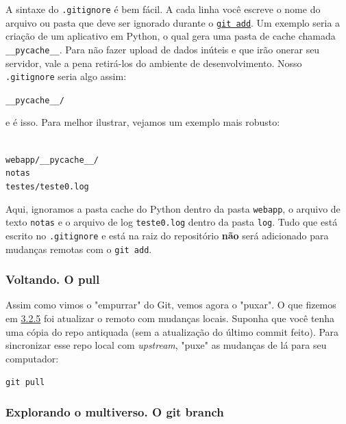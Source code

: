 \documentclass{article}
\begin{document}
  A sintaxe do \texttt{.gitignore} é bem fácil. A cada linha você escreve o nome do arquivo ou pasta que deve 
  ser ignorado durante o \href{sec:add}{\texttt{git add}}. Um exemplo seria a criação de um aplicativo em 
  Python, o qual gera uma pasta de cache chamada \texttt{\_\_pycache\_\_}. Para não fazer upload de dados inúteis e que 
  irão onerar seu servidor, vale a pena retirá-los do ambiente de desenvolvimento. Nosso \texttt{.gitignore} seria algo assim: 

  \vspace{1ex}
  \texttt{\_\_pycache\_\_/}
  \vspace{1ex}

  e é isso. Para melhor ilustrar, vejamos um exemplo mais robusto: 
  
  \vspace{1ex}
  \texttt{\\ 
  \noindent webapp/\_\_pycache\_\_/  \\ 
  \noindent notas \\ 
  \noindent testes/teste0.log}
  \vspace{1ex}

  Aqui, ignoramos a pasta cache do Python dentro da pasta \texttt{webapp}, o arquivo de texto \texttt{notas} e o arquivo 
  de log \texttt{teste0.log} dentro da pasta \texttt{log}. Tudo que está escrito no \texttt{.gitignore} e está na raiz 
  do repositório \textbf{não} será adicionado para mudanças remotas com o \texttt{git add}.
  
  
  \subsubsection{Voltando. O pull}

  Assim como vimos o "empurrar" do Git, vemos agora o "puxar". O que fizemos em \href{sec:push}{3.2.5} foi atualizar o remoto com 
  mudanças locais. Suponha que você tenha uma cópia do repo antiquada (sem a atualização do último commit feito). Para sincronizar 
  esse repo local com \textit{upstream}, "puxe" as mudanças de lá para seu computador: 

  \vspace{1ex}
  \texttt{git pull}
  \vspace{1ex}
 
  \subsubsection{Explorando o multiverso. O git branch}
\end{document}
